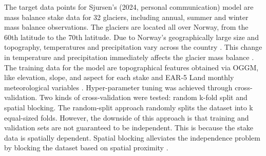 The target data points for Sjursen's (2024, personal communication) model are mass balance stake data for 32 glaciers, including annual, summer and winter mass balance observations. The glaciers are located all over Norway, from the 60th latitude to the 70th latitude. Due to Norway's geographically large size and topography, temperatures and precipitation vary across the country \cite{lussana-2018, lussana-2019}. This change in temperature and precipitation immediately affects the glacier mass balance \cite{nesje-2008}. The training data for the model are topographical features obtained via OGGM, like elevation, slope, and aspect for each stake and EAR-5 Land monthly meteorological variables \cite{maussion2019oggm, munoz2019era5}. Hyper-parameter tuning was achieved through cross-validation. Two kinds of cross-validation were tested: random k-fold split and spatial blocking. The random-split approach randomly splits the dataset into k equal-sized folds. However, the downside of this approach is that training and validation sets are not guaranteed to be independent. This is because the stake data is spatially dependent. Spatial blocking alleviates the independence problem by blocking the dataset based on spatial proximity \cite{roberts-2017}. 

